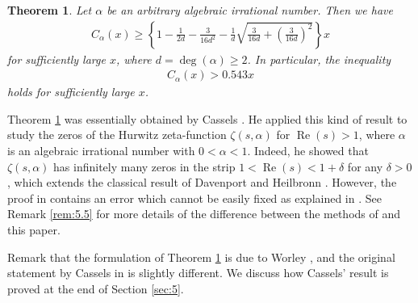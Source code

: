 \documentclass[a4paper,11pt]{amsart}
\newtheorem{theorem}{Theorem}[section]
\theoremstyle{definition}
\numberwithin{equation}{section}
\DeclareMathOperator{\RE}{Re}
\begin{document}
\begin{theorem}\label{thm:1.2}
Let $\alpha$ be an arbitrary algebraic irrational number. 
Then we have 
\begin{align*}
C_\alpha(x)
\geq \left\{1-\frac{1}{2d}-\frac{3}{16d^2}-\frac{1}{d}\sqrt{\frac{3}{16d}+\left(\frac{3}{16d}\right)^2}\right\} x
\end{align*}
for sufficiently large $x$, where $d=\deg(\alpha) \geq2$.  
In particular, the inequality
\begin{align*}
C_\alpha(x)
> 0.543x 
\end{align*}
holds for sufficiently large $x$. 
\end{theorem}

Theorem \ref{thm:1.2} was essentially obtained by Cassels \cite{Cassels1961}. 
He applied this kind of result to study the zeros of the Hurwitz zeta-function $\zeta(s,\alpha)$ for $\RE(s)>1$, where $\alpha$ is an algebraic irrational number with $0<\alpha<1$. 
Indeed, he showed that $\zeta(s,\alpha)$ has infinitely many zeros in the strip $1<\RE(s)<1+\delta$ for any $\delta>0$, which extends the classical result of Davenport and Heilbronn \cite{DavenportHeilbronn1936a}. 
However, the proof in \cite{Cassels1961} contains an error which cannot be easily fixed as explained in \cite{Mine2022+}. 
See Remark \ref{rem:5.5} for more details of the difference between the methods of \cite{Cassels1961} and this paper. 

Remark that the formulation of Theorem \ref{thm:1.2} is due to Worley \cite{Worley1970}, and the original statement by Cassels in \cite{Cassels1961} is slightly different. 
We discuss how Cassels' result is proved at the end of Section \ref{sec:5}. 
\end{document}
